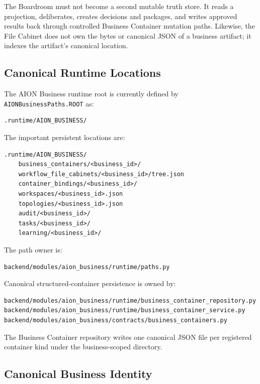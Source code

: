 The Boardroom must not become a second mutable truth store. It reads a projection,
deliberates, creates decisions and packages, and writes approved results back
through controlled Business Container mutation paths. Likewise, the File Cabinet
does not own the bytes or canonical JSON of a business artifact; it indexes the
artifact's canonical location.

\subsection{Canonical Runtime Locations}

The AION Business runtime root is currently defined by
\texttt{AIONBusinessPaths.ROOT} as:

\begin{verbatim}
.runtime/AION_BUSINESS/
\end{verbatim}

The important persistent locations are:

\begin{verbatim}
.runtime/AION_BUSINESS/
    business_containers/<business_id>/
    workflow_file_cabinets/<business_id>/tree.json
    container_bindings/<business_id>/
    workspaces/<business_id>.json
    topologies/<business_id>.json
    audit/<business_id>/
    tasks/<business_id>/
    learning/<business_id>/
\end{verbatim}

The path owner is:

\begin{verbatim}
backend/modules/aion_business/runtime/paths.py
\end{verbatim}

Canonical structured-container persistence is owned by:

\begin{verbatim}
backend/modules/aion_business/runtime/business_container_repository.py
backend/modules/aion_business/runtime/business_container_service.py
backend/modules/aion_business/contracts/business_containers.py
\end{verbatim}

The Business Container repository writes one canonical JSON file per registered
container kind under the business-scoped directory.

\subsection{Canonical Business Identity}

